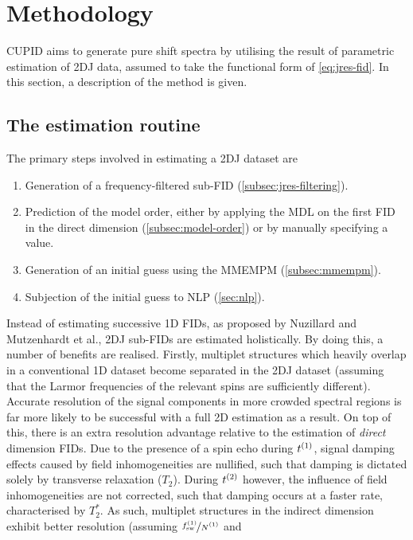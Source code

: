 \section{Methodology}
\ac{CUPID} aims to generate pure shift spectra by utilising the result of
parametric estimation of \ac{2DJ} data, assumed to take the functional form of
\cref{eq:jres-fid}. In this section, a description of the method is given.

\subsection{The estimation routine}
The primary steps involved in estimating a \ac{2DJ} dataset are
\begin{enumerate}
    \item Generation of a frequency-filtered sub-\ac{FID}
        (\cref{subsec:jres-filtering}).
    \item Prediction of the model order, either by applying the \ac{MDL} on the
        first \ac{FID} in the direct dimension (\cref{subsec:model-order}) or
        by manually specifying a
        value.
    \item Generation of an initial guess using the \ac{MMEMPM}
        (\cref{subsec:mmempm}).
    \item Subjection of the initial guess to \ac{NLP} (\cref{sec:nlp}).
\end{enumerate}
Instead of estimating successive \ac{1D} \acp{FID}, as proposed by
Nuzillard and Mutzenhardt et al., \ac{2DJ} sub-\acp{FID} are estimated
holistically. By doing this, a number of benefits are realised.
Firstly, multiplet structures which heavily overlap in a
conventional \ac{1D} dataset become separated in the \ac{2DJ} dataset (assuming
that the Larmor frequencies of the relevant spins are sufficiently different).
Accurate resolution of the signal components in more crowded spectral
regions is far more likely to be successful with a full \ac{2D} estimation as a
result.
On top of this, there is an extra resolution advantage relative to the
estimation of \emph{direct} dimension \acp{FID}. Due to the presence of a spin
echo during $t^{(1)}$, signal damping effects caused by field inhomogeneities are
nullified, such that damping is dictated solely by transverse relaxation
($T_2$). During $t^{(2)}$ however, the influence of field inhomogeneities are not
corrected, such that damping occurs at a faster rate, characterised by $T_2^*$.
As such, multiplet structures in the indirect dimension exhibit better
resolution (assuming $\nicefrac{\fswone}{\None}$ and
